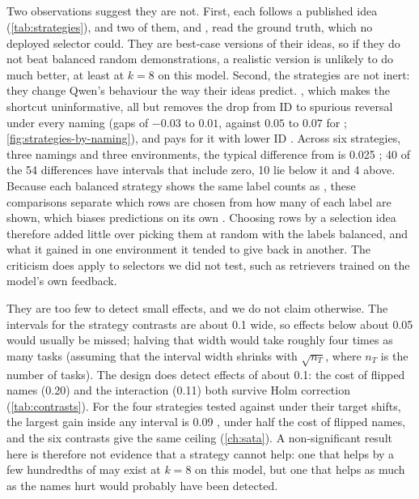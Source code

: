 \subsection*{}


Two observations suggest they are not. First, each follows a published idea (\autoref{tab:strategies}), and two of them,  and , read the ground truth, which no deployed selector could. They are best-case versions of their ideas, so if they do not beat balanced random demonstrations, a realistic version is unlikely to do much better, at least at $k = 8$ on this model. Second, the strategies are not inert: they change Qwen's behaviour the way their ideas predict. , which makes the shortcut uninformative, all but removes the drop from ID to spurious reversal under every naming (gaps of $-0.03$ to $0.01$, against $0.05$ to $0.07$ for ; \autoref{fig:strategies-by-naming}), and pays for it with lower ID \AUROC. Across six strategies, three namings and three environments, the typical difference from  is 0.025 \AUROC; 40 of the 54 differences have intervals that include zero, 10 lie below it and 4 above. Because each balanced strategy shows the same label counts as , these comparisons separate which rows are chosen from how many of each label are shown, which biases predictions on its own \citep{zhao2021calibrate}. Choosing rows by a selection idea therefore added little over picking them at random with the labels balanced, and what it gained in one environment it tended to give back in another. The criticism does apply to selectors we did not test, such as retrievers trained on the model's own feedback.


They are too few to detect small effects, and we do not claim otherwise. The intervals for the strategy contrasts are about 0.1 \AUROC wide, so effects below about 0.05 would usually be missed; halving that width would take roughly four times as many tasks (assuming that the interval width shrinks with $\sqrt{n_T}$, where $n_T$ is the number of tasks). The design does detect effects of about 0.1: the cost of flipped names (0.20) and the  interaction (0.11) both survive Holm correction (\autoref{tab:contrasts}). For the four strategies tested against  under their target shifts, the largest gain inside any interval is 0.09 \AUROC, under half the cost of flipped names, and the six \sata contrasts give the same ceiling (\autoref{ch:sata}). A non-significant result here is therefore not evidence that a strategy cannot help: one that helps by a few hundredths of \AUROC may exist at $k = 8$ on this model, but one that helps as much as the names hurt would probably have been detected.


